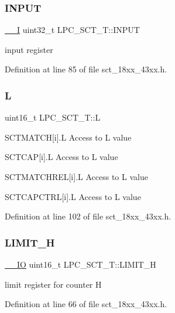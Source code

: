 \subsubsection{\texorpdfstring{I\+N\+P\+UT}{INPUT}}
{\footnotesize\ttfamily \hyperlink{core__sc300_8h_af63697ed9952cc71e1225efe205f6cd3}{\+\_\+\+\_\+I} uint32\+\_\+t L\+P\+C\+\_\+\+S\+C\+T\+\_\+\+T\+::\+I\+N\+P\+UT}

input register 

Definition at line 85 of file sct\+\_\+18xx\+\_\+43xx.\+h.

\mbox{\label{struct_l_p_c___s_c_t___t_ac73594dbfa9ce3fcc7ce43435dad7b88}} 
\subsubsection{\texorpdfstring{L}{L}}
{\footnotesize\ttfamily uint16\+\_\+t L\+P\+C\+\_\+\+S\+C\+T\+\_\+\+T\+::L}

S\+C\+T\+M\+A\+T\+CH\mbox{[}i\mbox{]}.L Access to L value

S\+C\+T\+C\+AP\mbox{[}i\mbox{]}.L Access to L value

S\+C\+T\+M\+A\+T\+C\+H\+R\+EL\mbox{[}i\mbox{]}.L Access to L value

S\+C\+T\+C\+A\+P\+C\+T\+RL\mbox{[}i\mbox{]}.L Access to L value 

Definition at line 102 of file sct\+\_\+18xx\+\_\+43xx.\+h.

\mbox{\label{struct_l_p_c___s_c_t___t_a7745725634b90b99fde9a359335b6f75}} 
\subsubsection{\texorpdfstring{L\+I\+M\+I\+T\+\_\+H}{LIMIT\_H}}
{\footnotesize\ttfamily \hyperlink{core__sc300_8h_aec43007d9998a0a0e01faede4133d6be}{\+\_\+\+\_\+\+IO} uint16\+\_\+t L\+P\+C\+\_\+\+S\+C\+T\+\_\+\+T\+::\+L\+I\+M\+I\+T\+\_\+H}

limit register for counter H 

Definition at line 66 of file sct\+\_\+18xx\+\_\+43xx.\+h.

